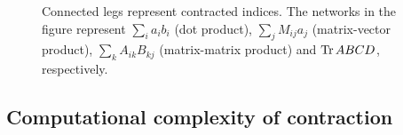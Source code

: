 \begin{figure}
  
  \caption{Connected legs represent contracted indices. The networks in the
  figure represent $\sum_i a_i b_i$ (dot product),
  $\sum_j M_{i j} a_j$ (matrix-vector product), $\sum_{k} A_{i k} B_{k
  j}$ (matrix-matrix product) and $\operatorname{Tr} A B C D$, respectively.}
  \label{fig:contracted_tensors}
\end{figure}



\subsection{Computational complexity of contraction}
